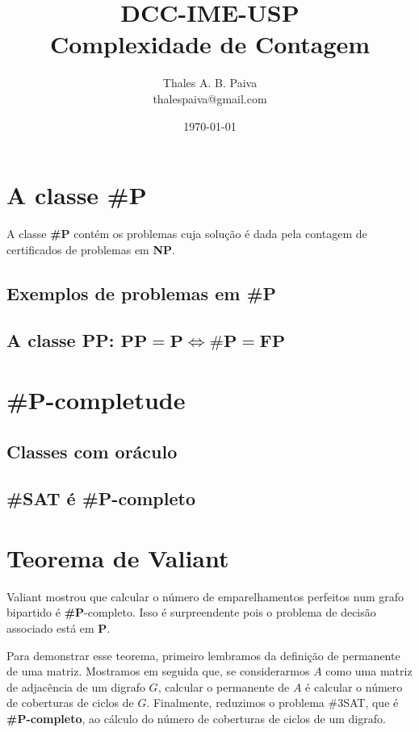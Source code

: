 \documentclass[paper=a4, fontsize=11pt]{scrartcl} %
\title{	
\normalfont \normalsize 
\textsc{DCC-IME-USP} \\ [25pt] %
\huge Complexidade de Contagem \\ %
}
\author{Thales A. B. Paiva \\ thalespaiva@gmail.com} %
\date{\normalsize\today} %
\numberwithin{figure}{section} %
\renewcommand{\P}{\textbf{P}\xspace}
\newcommand{\SP}{\textbf{\#P}\xspace}
\newcommand{\NP}{\textbf{NP}\xspace}
\newcommand{\FP}{\textbf{FP}\xspace}
\newcommand{\PP}{\textbf{PP}\xspace}
\newcommand{\SPc}{\textbf{\#P-completo}\xspace}
\newcommand{\prob}[1]{\textsc{\textbf{#1}}}
\begin{document}
\maketitle %
\tableofcontents



\pagebreak
\section{A classe \SP}

A classe \SP contém os problemas cuja solução é dada pela contagem de certificados de problemas em \NP.

\subsection{Exemplos de problemas em \SP}

\subsection{A classe \PP: $ \PP = \P \iff \SP = \FP $}

\pagebreak
\section{\SP-completude}

\subsection{Classes com oráculo}
\subsection{\prob{\#SAT} é \SPc}


\pagebreak
\section{Teorema de Valiant}

Valiant mostrou que calcular o número de emparelhamentos perfeitos num grafo bipartido é \SP-completo. Isso é surpreendente pois o problema de decisão associado está em \P. 

Para demonstrar esse teorema, primeiro lembramos da definição de permanente de uma matriz. Mostramos em seguida que, se considerarmos $A$ como uma matriz de adjacência de um digrafo $G$, calcular o permanente de $A$ é calcular o número de coberturas de ciclos de $G$. Finalmente, reduzimos o problema \#3SAT, que é \SPc, ao cálculo do número de coberturas de ciclos de um digrafo.
\end{document}
